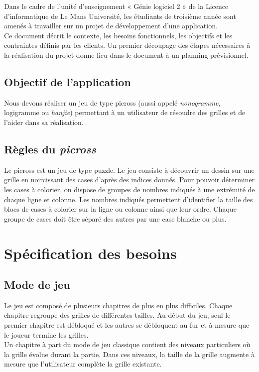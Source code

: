 \documentclass{report}
\begin{document}
		Dans le cadre de l'unité d'enseignement « Génie logiciel 2 » de la Licence d'informatique de Le Mans Université, les étudiants de troisième année sont amenés à travailler sur un projet de développement d'une application. \\
		Ce document décrit le contexte, les besoins fonctionnels, les objectifs et les contraintes définis par les clients. Un premier découpage des étapes nécessaires à la réalisation du projet donne lieu dans le document à un planning prévisionnel.

	
 	\section{Objectif de l'application}		
		Nous devons réaliser un jeu de type picross (aussi appelé \textit{nonogramme}, logigramme ou \textit{hanjie}) permettant à un utilisateur de résoudre des grilles et de l'aider dans sa réalisation.

	\section{Règles du \textit{picross}}
		Le picross est un jeu de type puzzle. Le jeu consiste à découvrir un dessin sur une grille en noircissant des cases d'après des indices donnés.	
		Pour pouvoir déterminer les cases à colorier, on dispose de groupes de nombres indiqués à une extrémité de chaque ligne et colonne.
		\newline
		Les nombres indiqués permettent d'identifier la taille des blocs de cases à colorier sur la ligne ou colonne ainsi que leur ordre.
		\newline
		Chaque groupe de cases doit être séparé des autres par une case blanche ou plus.
	
		
\chapter{Spécification des besoins}

		\section{Mode de jeu}
			Le jeu est composé de plusieurs chapitres de plus en plus difficiles. Chaque chapitre regroupe des grilles de différentes tailles. Au début du jeu, seul le premier chapitre est débloqué et les autres se débloquent au fur et à mesure que le joueur termine les grilles.\\
			Un chapitre à part du mode de jeu classique contient des niveaux particuliers où la grille évolue durant la partie. Dans ces niveaux, la taille de la grille augmente à mesure que l'utilisateur complète la grille existante.
\end{document}
